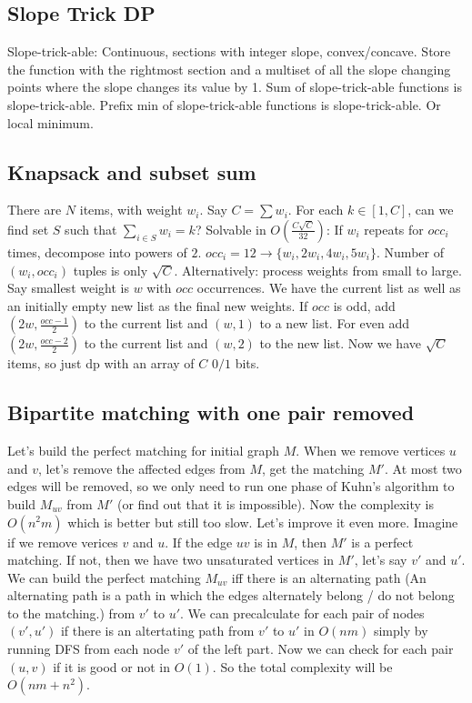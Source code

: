 \subsection{Slope Trick DP}
Slope-trick-able: Continuous, sections with integer slope, convex/concave.
Store the function with the rightmost section and a multiset of all the slope changing points where the slope changes its value by 1.
Sum of slope-trick-able functions is slope-trick-able.
Prefix min of slope-trick-able functions is slope-trick-able. Or local minimum.
\subsection{Knapsack and subset sum}
There are $N$ items, with weight $w_i$. Say $C=\sum w_i$. For each $k\in [1,C]$, can we find set $S$ such that $\sum_{i\in S}w_i=k$?
Solvable in $O(\frac{C\sqrt{C}}{32})$: If $w_i$ repeats for $occ_i$ times, decompose into powers of $2$.
$occ_i=12 \to \{w_i, 2w_i, 4w_i, 5w_i\}$. Number of $(w_i, occ_i)$ tuples is only $\sqrt{C}$.
Alternatively: process weights from small to large. Say smallest weight is $w$ with $occ$ occurrences. 
We have the current list as well as an initially empty new list as the final new weights.
If $occ$ is odd, add $(2w, \frac{occ-1}{2})$ to the current list and $(w, 1)$ to a new list. 
For even add $(2w, \frac{occ-2}{2})$ to the current list and $(w, 2)$ to the new list.
Now we have $\sqrt{C}$ items, so just dp with an array of $C$ $0/1$ bits.
\subsection{Bipartite matching with one pair removed}
Let's build the perfect matching for initial graph $M$. When we remove vertices $u$ and $v$, let's remove the
affected edges from $M$, get the matching $M'$. At most two edges will be removed, so we only need to
run one phase of Kuhn's algorithm to build $M_{uv}$ from $M'$ (or find out that it is impossible). Now the
complexity is $O(n^2 m)$ which is better but still too slow. Let's improve it even more.
Imagine if we remove verices $v$ and $u$. If the edge $uv$ is in $M$, then $M'$
is a perfect matching. If not, then we have two unsaturated vertices in $M'$, let's say $v'$ and $u'$. 
We can build the perfect matching $M_{uv}$ iff there is an alternating path 
(An alternating path is a path in which the edges alternately belong / do not belong to the matching.)
from $v'$ to $u'$. 
We can precalculate for each pair of nodes $(v', u')$ if there is an
altertating path from $v'$ to $u'$ in $O(nm)$ simply by running DFS from each node $v'$ of the left part.
Now we can check for each pair $(u, v)$ if it is good or not in $O(1)$. 
So the total complexity will be $O(nm + n^2)$.